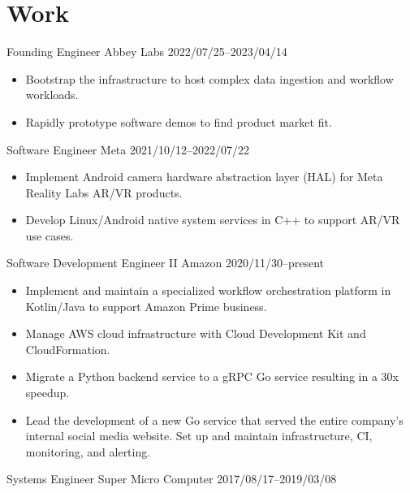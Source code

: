 \section{Work}

\begin{experiencelist}
   \experienceitem
        {Founding Engineer}
        {Abbey Labs}
        {2022/07/25--2023/04/14}
    \begin{itemize}[noitemsep, topsep=0pt]
        \item
            Bootstrap the infrastructure to host complex data ingestion and workflow workloads.
        \item
            Rapidly prototype software demos to find product market fit.
    \end{itemize}

    \experienceitem
        {Software Engineer}
        {Meta}
        {2021/10/12--2022/07/22}
    \begin{itemize}[noitemsep, topsep=0pt]
        \item
            Implement Android camera hardware abstraction layer (HAL) for
            Meta Reality Labs AR/VR products.
        \item
            Develop Linux/Android native system services in C++ to support
            AR/VR use cases.
    \end{itemize}

    \experienceitem
        {Software Development Engineer II}
        {Amazon}
        {2020/11/30--present}
    \begin{itemize}[noitemsep, topsep=0pt]
        \item
            Implement and maintain a specialized workflow orchestration
            platform in Kotlin/Java to support Amazon Prime business.
        \item
            Manage AWS cloud infrastructure with Cloud Development Kit and
            CloudFormation.
    \end{itemize}

    \begin{itemize}[noitemsep, topsep=0pt]
        \item
            Migrate a Python backend service to a gRPC Go service resulting in
            a 30x speedup.
        \item
            Lead the development of a new Go service that served the entire
            company's internal social media website. Set up and maintain
            infrastructure, CI, monitoring, and alerting.
    \end{itemize}

    \experienceitem
        {Systems Engineer}
        {Super Micro Computer}
        {2017/08/17--2019/03/08}
\end{experiencelist}
